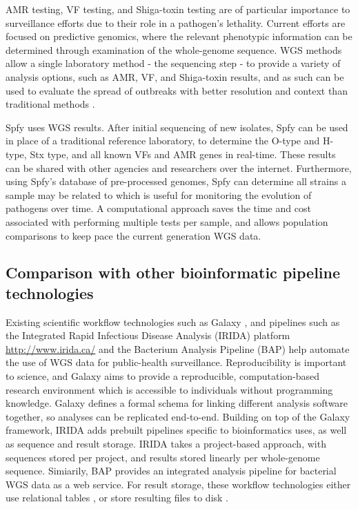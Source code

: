 \documentclass{article}
\begin{document}
AMR testing, VF testing, and Shiga-toxin testing are of particular importance to surveillance efforts due to their role in a pathogen's lethality.
Current efforts are focused on predictive genomics, where the relevant phenotypic information can be determined through examination of the whole-genome sequence.
WGS methods allow a single laboratory method - the sequencing step - to provide a variety of analysis options, such as AMR, VF, and Shiga-toxin results, and as such can be used to evaluate the spread of outbreaks with better resolution and context than traditional methods \cite{ronholm2016navigating}.

Spfy uses WGS results.
After initial sequencing of new isolates, Spfy can be used in place of a traditional reference laboratory, to determine the O-type and H-type, Stx type, and all known VFs and AMR genes in real-time.
These results can be shared with other agencies and researchers over the internet.
Furthermore, using Spfy's database of pre-processed genomes, Spfy can determine all strains a sample may be related to which is useful for monitoring the evolution of pathogens over time.
A computational approach saves the time and cost associated with performing multiple tests per sample, and allows population comparisons to keep pace the current generation WGS data.

\subsection{Comparison with other bioinformatic pipeline technologies}

Existing scientific workflow technologies such as Galaxy \cite{goecks2010galaxy}, and pipelines such as the Integrated Rapid Infectious Disease Analysis (IRIDA) platform \url{http://www.irida.ca/} and the Bacterium Analysis Pipeline (BAP) \cite{thomsen2016bacterial} help automate the use of WGS data for public-health surveillance.
Reproducibility is important to science, and Galaxy aims to provide a reproducible, computation-based research environment which is accessible to individuals without programming knowledge. Galaxy defines a formal schema for linking different analysis software together, so analyses can be replicated end-to-end.
Building on top of the Galaxy framework, IRIDA adds prebuilt pipelines specific to bioinformatics uses, as well as sequence and result storage. IRIDA takes a project-based approach, with sequences stored per project, and results stored linearly per whole-genome sequence. Simiarily, BAP provides an integrated analysis pipeline for bacterial WGS data as a web service.
For result storage, these workflow technologies either use relational tables \cite{goecks2010galaxy}, or store resulting files to disk \cite{thomsen2016bacterial}.
\end{document}
